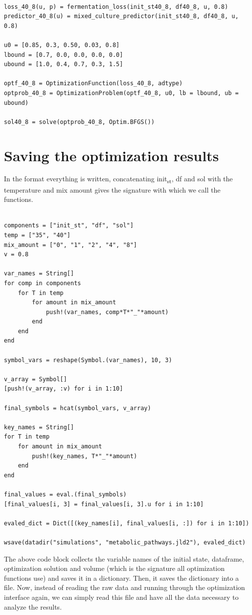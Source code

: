 \documentclass[11pt]{article}
\begin{document}
\begin{verbatim}

loss_40_8(u, p) = fermentation_loss(init_st40_8, df40_8, u, 0.8)
predictor_40_8(u) = mixed_culture_predictor(init_st40_8, df40_8, u, 0.8)

u0 = [0.85, 0.3, 0.50, 0.03, 0.8]
lbound = [0.7, 0.0, 0.0, 0.0, 0.0]
ubound = [1.0, 0.4, 0.7, 0.3, 1.5]

optf_40_8 = OptimizationFunction(loss_40_8, adtype)
optprob_40_8 = OptimizationProblem(optf_40_8, u0, lb = lbound, ub = ubound)

sol40_8 = solve(optprob_40_8, Optim.BFGS())
\end{verbatim}

\section{Saving the optimization results}
\label{sec:orgc752861}
In the format everything is written, concatenating init\textsubscript{st}, df and sol with the temperature and mix amount gives the signature with which we call the functions.

\begin{verbatim}

components = ["init_st", "df", "sol"]
temp = ["35", "40"]
mix_amount = ["0", "1", "2", "4", "8"]
v = 0.8

var_names = String[]
for comp in components
    for T in temp
        for amount in mix_amount
            push!(var_names, comp*T*"_"*amount)
        end
    end
end

symbol_vars = reshape(Symbol.(var_names), 10, 3)

v_array = Symbol[]
[push!(v_array, :v) for i in 1:10]

final_symbols = hcat(symbol_vars, v_array)

key_names = String[]
for T in temp
    for amount in mix_amount
        push!(key_names, T*"_"*amount)
    end
end

final_values = eval.(final_symbols)
[final_values[i, 3] = final_values[i, 3].u for i in 1:10]

evaled_dict = Dict([(key_names[i], final_values[i, :]) for i in 1:10])

wsave(datadir("simulations", "metabolic_pathways.jld2"), evaled_dict)

\end{verbatim}

The above code block collects the variable names of the initial state, dataframe, optimization solution and volume (which is the signature all optimization functions use) and saves it in a dictionary. Then, it saves the dictionary into a file. Now, instead of reading the raw data and running through the optimization interface again, we can simply read this file and have all the data necessary to analyze the results.
\end{document}
